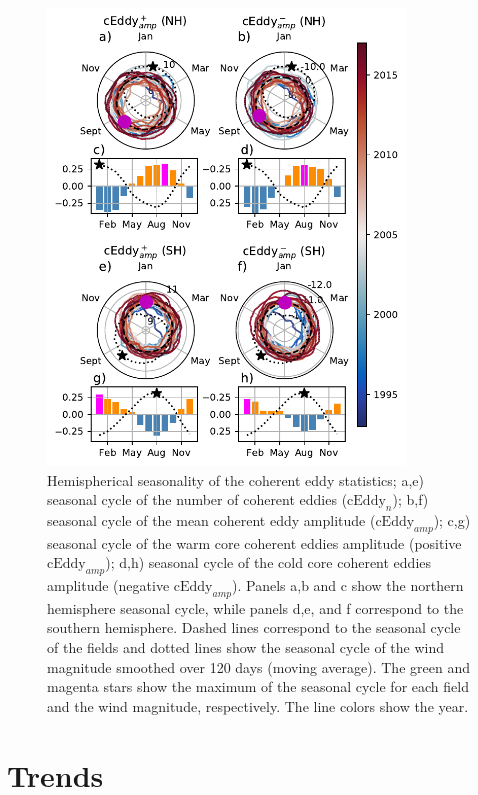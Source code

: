 \documentclass[draft,linenumbers]{agujournal2019}
\newcommand{\cEddy}{\textrm{cEddy}}
\begin{document}
	\begin{figure}
	    \centering
	    \includegraphics[width=95mm]{figures/All_polar_plots_eddy_stats_polarity_V4.pdf}
	    \caption{Hemispherical seasonality of the coherent eddy statistics;
		a,e) seasonal cycle of the number of coherent eddies ($\cEddy_n$); b,f) seasonal cycle of the mean coherent eddy amplitude ($\cEddy_{amp}$); c,g) seasonal cycle of the warm core coherent eddies amplitude (positive $\cEddy_{amp}$); d,h) seasonal cycle of the cold core coherent eddies amplitude (negative $\cEddy_{amp}$). Panels a,b and c show the northern hemisphere seasonal cycle, while panels d,e, and f correspond to the southern hemisphere. Dashed lines correspond to the seasonal cycle of the fields and dotted lines show the seasonal cycle of the wind magnitude smoothed over 120 days (moving average). The green and magenta stars show the maximum of the seasonal cycle for each field and the wind magnitude, respectively. The line colors show the year.}
	    \label{fig:eddy_stats_polar}
	\end{figure}

	\section{Trends}
	\label{sec:CE_trends}
\end{document}

